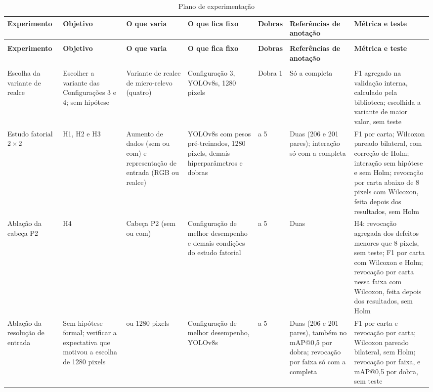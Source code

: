 \documentclass[
    12pt,                %
    openright,           %
    oneside,             %
    a4paper,             %
    english,             %
    brazil               %
]{abntex2}
\begin{document}
{
\setlength{\tabcolsep}{4pt}
\begin{longtable}{>{\scriptsize\raggedright\arraybackslash}p{1.9cm}>{\scriptsize\raggedright\arraybackslash}p{1.8cm}>{\scriptsize\raggedright\arraybackslash}p{2.1cm}>{\scriptsize\raggedright\arraybackslash}p{2.3cm}>{\scriptsize\raggedright\arraybackslash}p{1.0cm}>{\scriptsize\raggedright\arraybackslash}p{2.0cm}>{\scriptsize\raggedright\arraybackslash}p{2.8cm}}
\caption{Plano de experimentação}\label{tab:plano_experimentacao}\\
\toprule
\textbf{Experimento} & \textbf{Objetivo} & \textbf{O que varia} & \textbf{O que fica fixo} & \textbf{Dobras} & \textbf{Referências de anotação} & \textbf{Métrica e teste} \\
\midrule
\endfirsthead
\multicolumn{7}{l}{\scriptsize\textit{(continuação)}}\\
\toprule
\textbf{Experimento} & \textbf{Objetivo} & \textbf{O que varia} & \textbf{O que fica fixo} & \textbf{Dobras} & \textbf{Referências de anotação} & \textbf{Métrica e teste} \\
\midrule
\endhead
\midrule
\multicolumn{7}{r}{\scriptsize\textit{(continua)}}\\
\endfoot
\bottomrule
\endlastfoot
Escolha da variante de realce & Escolher a variante das Configurações 3 e 4; sem hipótese & Variante de realce de micro-relevo (quatro) & Configuração 3, YOLOv8s, 1280 pixels & Dobra 1 & Só a completa & F1 agregado na validação interna, calculado pela biblioteca; escolhida a variante de maior valor, sem teste \\
\midrule
Estudo fatorial $2 \times 2$ & H1, H2 e H3 & Aumento de dados (sem ou com) e representação de entrada (RGB ou realce) & YOLOv8s com pesos pré-treinados, 1280 pixels, demais hiperparâmetros e dobras & 1 a 5 & Duas (206 e 201 pares); interação só com a completa & F1 por carta; Wilcoxon pareado bilateral, com correção de Holm; interação sem hipótese e sem Holm; revocação por carta abaixo de 8 pixels com Wilcoxon, feita depois dos resultados, sem Holm \\
\midrule
Ablação da cabeça P2 & H4 & Cabeça P2 (sem ou com) & Configuração de melhor desempenho e demais condições do estudo fatorial & 1 a 5 & Duas & H4: revocação agregada dos defeitos menores que 8 pixels, sem teste; F1 por carta com Wilcoxon e Holm; revocação por carta nessa faixa com Wilcoxon, feita depois dos resultados, sem Holm \\
\midrule
Ablação da resolução de entrada & Sem hipótese formal; verificar a expectativa que motivou a escolha de 1280 pixels & 640 ou 1280 pixels & Configuração de melhor desempenho, YOLOv8s & 1 a 5 & Duas (206 e 201 pares), também no mAP@0,5 por dobra; revocação por faixa só com a completa & F1 por carta e revocação por carta; Wilcoxon pareado bilateral, sem Holm; revocação por faixa, e mAP@0,5 por dobra, sem teste \\

\end{longtable}}
\end{document}
